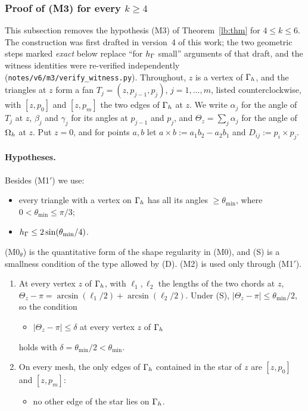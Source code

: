 \subsubsection{Proof of (M3) for every \texorpdfstring{$k\ge4$}{k>=4}}\label{m3:sec}

This subsection removes the hypothesis (M3) of Theorem~\ref{lb:thm} for $4\le k\le 6$. The construction was first drafted in version~4 of this work; the two geometric steps marked \emph{exact} below replace ``for $h_\Gamma$ small'' arguments of that draft, and the witness identities were re-verified independently (\texttt{notes/v6/m3/verify\_witness.py}). Throughout, $z$ is a vertex of $\Gamma_h$, and the triangles at $z$ form a fan $T_j=(z,p_{j-1},p_j)$, $j=1,\dots,m$, listed counterclockwise, with $[z,p_0]$ and $[z,p_m]$ the two edges of $\Gamma_h$ at $z$. We write $\alpha_j$ for the angle of $T_j$ at $z$, $\beta_j$ and $\gamma_j$ for its angles at $p_{j-1}$ and $p_j$, and $\Theta_z=\sum_j\alpha_j$ for the angle of $\Omega_h$ at $z$. Put $z=0$, and for points $a,b$ let $a\times b:=a_1b_2-a_2b_1$ and $D_{ij}:=p_i\times p_j$.

\paragraph{Hypotheses.} Besides (M1$'$) we use:
\begin{itemize}
\item[(M0$_\theta$)] every triangle with a vertex on $\Gamma_h$ has all its angles $\ge\theta_{\min}$, where $0<\theta_{\min}\le\pi/3$;
\item[(S)] $h_\Gamma\le2\sin(\theta_{\min}/4)$.
\end{itemize}
(M0$_\theta$) is the quantitative form of the shape regularity in (M0), and (S) is a smallness condition of the type allowed by (D). (M2) is used only through (M1$'$).

\begin{lemma}\label{m3:geom}
\begin{enumerate}[label=(\alph*)]
\item At every vertex $z$ of $\Gamma_h$, with $\ell_1,\ell_2$ the lengths of the two chords at $z$, $\Theta_z-\pi=\arcsin(\ell_1/2)+\arcsin(\ell_2/2)$. Under (S), $|\Theta_z-\pi|\le\theta_{\min}/2$, so the condition
\begin{itemize}
\item[(A$_\delta$)] $|\Theta_z-\pi|\le\delta$ at every vertex $z$ of $\Gamma_h$
\end{itemize}
holds with $\delta=\theta_{\min}/2<\theta_{\min}$.
\item On every mesh, the only edges of $\Gamma_h$ contained in the star of $z$ are $[z,p_0]$ and $[z,p_m]$:
\begin{itemize}
\item[(G)] no other edge of the star lies on $\Gamma_h$.
\end{itemize}
\end{enumerate}
\end{lemma}


